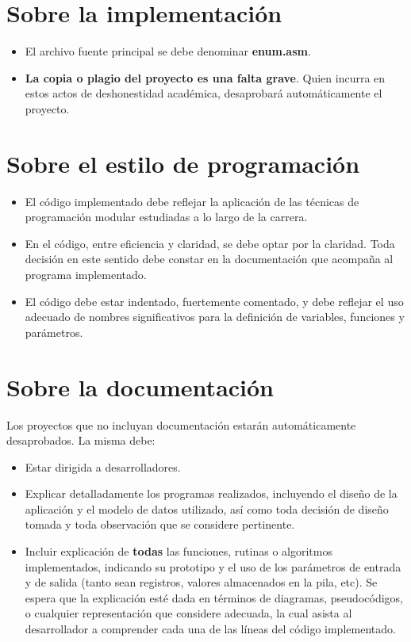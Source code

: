 \documentclass[12pt,a4paper]{article}
\begin{document}
\section*{Sobre la implementación}
\begin{itemize}
	
	\item El archivo fuente principal se debe denominar \textbf{\textsf{enum.asm}}.
	
	\item \textbf{La copia o plagio del proyecto es una falta grave}. Quien incurra en estos actos de deshonestidad académica, desaprobará automáticamente el proyecto.
\end{itemize}

\section*{Sobre el estilo de programación}
\begin{itemize}
		
	\item El código implementado debe reflejar la aplicación de las técnicas de programación modular estudiadas a lo largo de la carrera.
	
	\item En el código, entre eficiencia y claridad, se debe optar por la claridad. Toda decisión en este sentido debe constar en la documentación que acompaña al programa implementado.
	
	\item El código debe estar indentado, fuertemente comentado, y debe reflejar el uso adecuado de nombres significativos para la definición de variables, funciones y parámetros.
	
\end{itemize}

\section*{Sobre la documentación}

Los proyectos que no incluyan documentación estarán automáticamente desaprobados. La misma debe:
\begin{itemize}
	
	\item Estar dirigida a desarrolladores.
	
	\item Explicar detalladamente los programas realizados, incluyendo el diseño de la aplicación y el modelo de datos utilizado, así como toda decisión de diseño tomada y toda observación que se considere pertinente.
	
	\item Incluir explicación de \textbf{todas} las funciones, rutinas o algoritmos implementados, indicando su prototipo y el uso de los parámetros de entrada y de salida (tanto sean registros, valores almacenados en la pila, etc). Se espera que la explicación esté dada en términos de diagramas, pseudocódigos, o cualquier representación que considere adecuada, la cual asista al desarrollador a comprender cada una de las líneas del código implementado.
	
\end{itemize}
\end{document}

